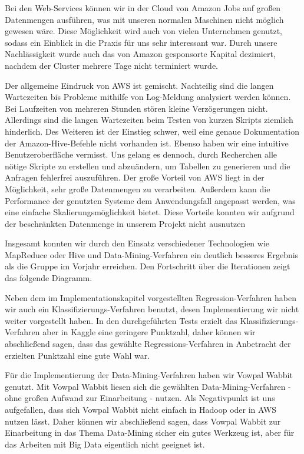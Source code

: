 Bei den Web-Services können wir in der Cloud von Amazon Jobs auf großen Datenmengen ausführen, was mit unseren normalen Maschinen nicht möglich gewesen wäre.
Diese Möglichkeit wird auch von vielen Unternehmen genutzt, sodass ein Einblick in die Praxis für uns sehr interessant war.
Durch unsere Nachlässigkeit wurde auch das von Amazon gesponsorte Kapital dezimiert,
nachdem der Cluster mehrere Tage nicht terminiert wurde.

Der allgemeine Eindruck von AWS ist gemischt. 
Nachteilig sind die langen Wartezeiten bis Probleme mithilfe von Log-Meldung
analysiert werden können. 
Bei Laufzeiten von mehreren Stunden stören kleine Verzögerungen nicht.
Allerdings sind die langen Wartezeiten beim Testen von kurzen Skripts
ziemlich hinderlich. 
Des Weiteren ist der Einstieg schwer, weil eine genaue Dokumentation der Amazon-Hive-Befehle nicht vorhanden ist.
Ebenso haben wir eine intuitive Benutzeroberfläche vermisst.
Uns gelang es dennoch, durch Recherchen alle nötige Skripte zu erstellen und abzuändern, um Tabellen zu generieren und die Anfragen fehlerfrei auszuführen.
Der große Vorteil von AWS liegt in der Möglichkeit, sehr große Datenmengen zu verarbeiten.
Außerdem kann die Performance der genutzten Systeme dem 
Anwendungsfall angepasst werden, was eine einfache Skalierungsmöglichkeit bietet.
Diese Vorteile konnten wir aufgrund der beschränkten Datenmenge in unserem
Projekt nicht ausnutzen

Insgesamt konnten wir durch den Einsatz verschiedener Technologien wie MapReduce oder Hive und Data-Mining-Verfahren ein deutlich besseres Ergebnis als die Gruppe im Vorjahr erreichen. Den Fortschritt über die Iterationen zeigt das folgende Diagramm.

Neben dem im Implementationskapitel vorgestellten Regression-Verfahren haben wir auch ein Klassifizierungs-Verfahren benutzt,
desen Implementierung wir nicht weiter vorgestellt haben. In den durchgeführten Tests erzielt das Klassifizierungs-Verfahren
aber in Kaggle eine geringere Punktzahl, daher können wir abschließend sagen, dass das gewählte Regressions-Verfahren in
Anbetracht der erzielten Punktzahl eine gute Wahl war.

Für die Implementierung der Data-Mining-Verfahren haben wir Vowpal Wabbit genutzt. Mit Vowpal Wabbit liesen sich die
gewählten Data-Mining-Verfahren - ohne großen Aufwand zur Einarbeitung - nutzen. Als Negativpunkt ist uns aufgefallen, dass
sich Vowpal Wabbit nicht einfach in Hadoop oder in AWS nutzen lässt. Daher können wir abschließend sagen, dass Vowpal Wabbit
zur Einarbeitung in das Thema Data-Mining sicher ein gutes Werkzeug ist, aber für das Arbeiten mit Big Data eigentlich nicht
geeignet ist.

